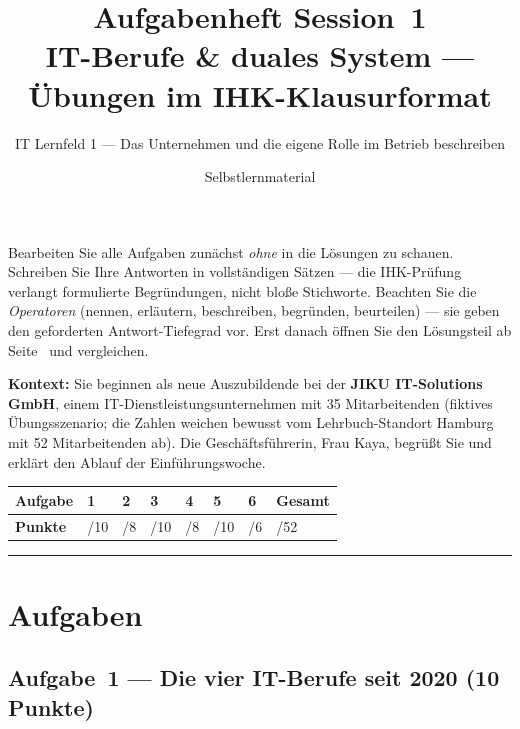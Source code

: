 \documentclass[11pt, a4paper]{article}
\title{\vspace*{-1.5cm}\Huge\bfseries\color{bfwPrimaryDark}Aufgabenheft Session~1\\[0.4em]
  \large\color{bfwInkSoft}\textnormal{IT-Berufe \& duales System --- Übungen im IHK-Klausurformat}}
\author{\textsf{IT Lernfeld 1 --- Das Unternehmen und die eigene Rolle im Betrieb beschreiben}}
\date{Selbstlernmaterial}
\begin{document}
\maketitle
\thispagestyle{empty}

\begin{merksatz}[title={\bfseries So nutzen Sie dieses Aufgabenheft}]
Bearbeiten Sie alle Aufgaben zunächst \emph{ohne} in die Lösungen zu schauen. Schreiben
Sie Ihre Antworten in vollständigen Sätzen --- die IHK-Prüfung verlangt formulierte
Begründungen, nicht bloße Stichworte. Beachten Sie die \emph{Operatoren} (nennen,
erläutern, beschreiben, begründen, beurteilen) --- sie geben den geforderten
Antwort-Tiefegrad vor. Erst danach öffnen Sie den Lösungsteil ab Seite~\pageref{loesungen}
und vergleichen.
\end{merksatz}

\bigskip

\textbf{Kontext:} Sie beginnen als neue Auszubildende bei der \textbf{JIKU IT-Solutions GmbH},
einem IT-Dienstleistungsunternehmen mit 35 Mitarbeitenden (fiktives Übungsszenario; die Zahlen
weichen bewusst vom Lehrbuch-Standort Hamburg mit 52 Mitarbeitenden ab). Die Geschäftsführerin,
Frau Kaya, begrüßt Sie und erklärt den Ablauf der Einführungswoche.

\bigskip

\noindent
\begin{tabular}{|l|l|l|l|l|l|l|l|}
\hline
\textbf{Aufgabe} & 1 & 2 & 3 & 4 & 5 & 6 & \textbf{Gesamt}\\
\hline
\textbf{Punkte} & /10 & /8 & /10 & /8 & /10 & /6 & /52\\
\hline
\end{tabular}

\tableofcontents
\vspace{1em}
\hrule

\section{Aufgaben}

\subsection*{Aufgabe~1 --- Die vier IT-Berufe seit 2020 (10 Punkte)}
\end{document}
